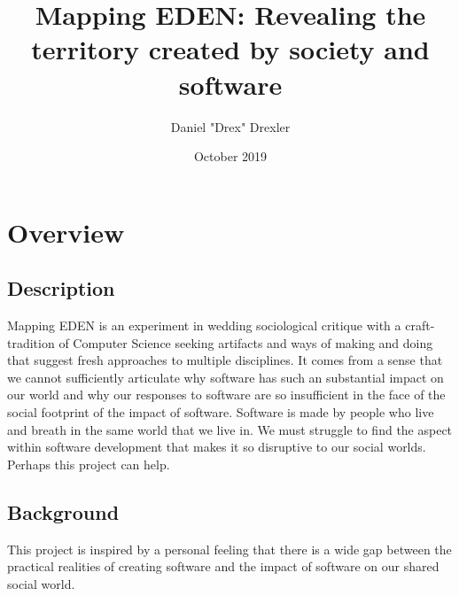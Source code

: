 \documentclass[a4paper,man,natbib]{apa6}
\title{Mapping EDEN: Revealing the territory created by society and software}
\author{Daniel "Drex" Drexler}
\affiliation{Center for Science, Technology and Society at Drexel University}
\date{October 2019}
\begin{document}
   \maketitle
   \section*{Overview}
   \subsection*{Description}
   Mapping EDEN is an experiment in wedding sociological critique with a craft-tradition of Computer Science seeking artifacts and ways of making and doing that suggest fresh approaches to multiple disciplines. It comes from a sense that we cannot sufficiently articulate why software has such an substantial impact on our world and why our responses to software are so insufficient in the face of the social footprint of the impact of software. Software is made by people who live and breath in the same world that we live in. We must struggle to find the aspect within software development that makes it so disruptive to our social worlds. Perhaps this project can help.
   \subsection*{Background}
   This project is inspired by a personal feeling that there is a wide gap between the practical realities of creating software and the impact of software on our shared social world. 
\end{document}
